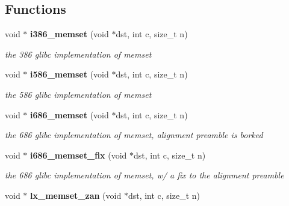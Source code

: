 \subsection*{Functions}
\begin{CompactItemize}
\item 
{}
void $\ast$ {\bf i386\_\-memset} (void $\ast$dst, int c, size\_\-t n)\label{memset_2def__test_8h_a1}

\begin{CompactList}\small\item\em the 386 glibc implementation of memset\item\end{CompactList}\item 
{}
void $\ast$ {\bf i586\_\-memset} (void $\ast$dst, int c, size\_\-t n)\label{memset_2def__test_8h_a2}

\begin{CompactList}\small\item\em the 586 glibc implementation of memset\item\end{CompactList}\item 
{}
void $\ast$ {\bf i686\_\-memset} (void $\ast$dst, int c, size\_\-t n)\label{memset_2def__test_8h_a3}

\begin{CompactList}\small\item\em the 686 glibc implementation of memset, alignment preamble is borked\item\end{CompactList}\item 
{}
void $\ast$ {\bf i686\_\-memset\_\-fix} (void $\ast$dst, int c, size\_\-t n)\label{memset_2def__test_8h_a4}

\begin{CompactList}\small\item\em the 686 glibc implementation of memset, w/ a fix to the alignment preamble\item\end{CompactList}\item 
{}
void $\ast$ {\bf lx\_\-memset\_\-zan} (void $\ast$dst, int c, size\_\-t n)\label{memset_2def__test_8h_a5}


\end{CompactItemize}
